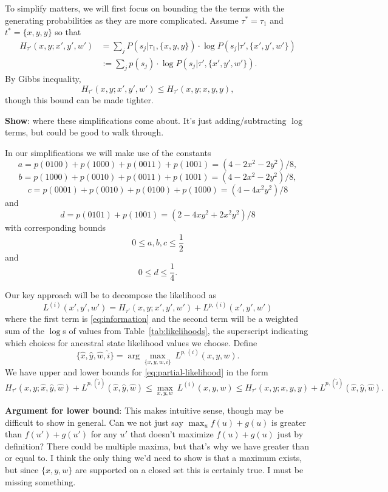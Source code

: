 \documentclass[a4paper]{article}
\begin{document}
To simplify matters, we will first focus on bounding the the terms with the generating probabilities as they are more complicated.
Assume $\tau^*=\tau_1$ and $t^*=\{x,y,y\}$ so that
\begin{align}
\label{eq:information}
H_{\tau'}(x, y;x', y', w') &= \sum_{j} P(s_j | \tau_1, \{x,y,y\}) \cdot \log P(s_j | \tau', \{x',y',w'\}) \nonumber \\ 
&:= \sum_{j} p(s_j) \cdot \log P(s_j | \tau', \{x',y',w'\}).
\end{align}
By Gibbs inequality,
$$
H_{\tau'}(x, y;x', y', w') \le H_{\tau'}(x, y;x, y, y),
$$
though this bound can be made tighter.

\textbf{Show}: where these simplifications come about.
It's just adding/subtracting $\log$ terms, but could be good to walk through.

In our simplifications we will make use of the constants
$$
a = p(0100) + p(1000) + p(0011) + p(1001) = (4-2x^2-2y^2)/8,
$$
$$
b = p(1000) + p(0010) + p(0011) + p(1001) = (4-2x^2-2y^2)/8,
$$
$$
c = p(0001) + p(0010) + p(0100) + p(1000) = (4-4x^2y^2)/8
$$
and
$$
d = p(0101) + p(1001) = (2-4xy^2+2x^2y^2)/8
$$
with corresponding bounds
$$
0 \le a,b,c \le \frac{1}{2}
$$
and
$$
0 \le d \le \frac{1}{4}.
$$

Our key approach will be to decompose the likelihood as
\begin{equation}
\label{eq:partial-likelihood}
L^{(i)}(x', y', w') = H_{\tau'}(x,y;x',y',w') + L^{p,(i)}(x',y',w')
\end{equation}
where the first term is \eqref{eq:information} and the second term will be a weighted sum of the $\log$s of values from Table~\ref{tab:likelihoods}, the superscript indicating which choices for ancestral state likelihood values we choose.
Define
$$
\{\hat{x}, \hat{y}, \hat{w}, \hat{i}\} = \arg\max_{\{x,y,w,i\}} \ L^{p,(i)}(x,y,w).
$$
We have upper and lower bounds for \eqref{eq:partial-likelihood} in the form
$$
H_{\tau'}(x,y; \hat{x}, \hat{y}, \hat{w}) + L^{p,(\hat{i})}(\hat{x}, \hat{y}, \hat{w}) \le \max_{x,y,w} \ L^{(i)}(x,y,w) \le H_{\tau'}(x,y;x,y,y) + L^{p,(\hat{i})}(\hat{x}, \hat{y}, \hat{w}).
$$

\textbf{Argument for lower bound}: This makes intuitive sense, though may be difficult to show in general.
Can we not just say $\max_u f(u) + g(u)$ is greater than $f(u') + g(u')$ for any $u'$ that doesn't maximize $f(u) + g(u)$ just by definition?
There could be multiple maxima, but that's why we have greater than or equal to.
I think the only thing we'd need to show is that a maximum exists, but since $\{x,y,w\}$ are supported on a closed set this is certainly true.
I must be missing something.
\end{document}
